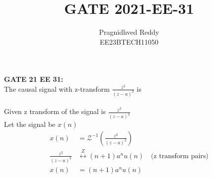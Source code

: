 \documentclass[journal,12pt,twocolumn]{IEEEtran}
\title{GATE 2021-EE-31}
\author{Pragnidhved Reddy\\EE23BTECH11050}
\date{}
\begin{document}
\maketitle
\newpage
\bigskip
\textbf{GATE 21 EE 31:}\\
The causal signal with z-transform $\frac{z^2}{(z-a)^{2}}$ is \\
\solution\\
Given z transform of the signal is $\frac{z^2}{(z-a)^{2}}$\\
Let the signal be $x(n)$
\begin{align}
x(n)&=\mathcal{Z}^{-1}\left(\frac{z^2}{(z-a)^{2}}\right)\\[6pt]
\frac{z^2}{(z-a)^2}&\overset{Z}\longleftrightarrow (n+1)a^nu(n)\quad \text{(z transform pairs)}\\[6pt] 
x(n)&=(n+1)a^n u(n)
\end{align}
\end{document}

